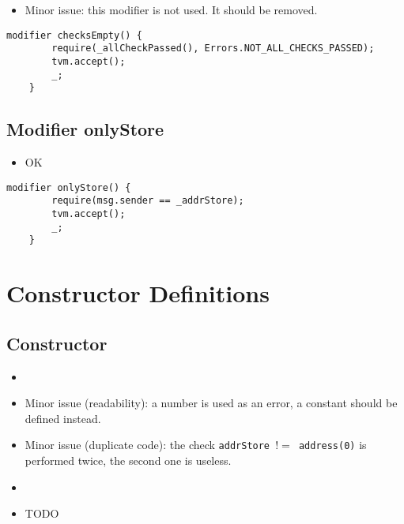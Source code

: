 \begin{itemize}
\item Minor issue: this modifier is not used. It should be removed.
\end{itemize}

\begin{lstlisting}[firstnumber=66]
    modifier checksEmpty() {
        require(_allCheckPassed(), Errors.NOT_ALL_CHECKS_PASSED);
        tvm.accept();
        _;
    }
\end{lstlisting}

\subsection{Modifier onlyStore}

\begin{itemize}
\item OK
\end{itemize}


\begin{lstlisting}[firstnumber=72]
    modifier onlyStore() {
        require(msg.sender == _addrStore);
        tvm.accept();
        _;
    }
\end{lstlisting}

\section{Constructor Definitions}


\subsection{Constructor}

\begin{itemize}
\item {}
\item Minor issue (readability): a number is used as an error, a
  constant should be defined instead.
\item Minor issue (duplicate code): the check {\tt addrStore $!=$
  address(0)} is performed twice, the second one is useless.
\item {}
\item TODO
\end{itemize}

